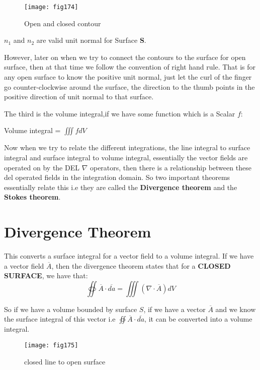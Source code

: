 \begin{figure}
	\centering
	\texttt{[image: fig174]}
	\caption{Open and closed contour}
	\label{fig:open-and-closed-contour}
\end{figure}


\textbf{$n_1$} and \textbf{$n_2$} are valid unit normal for Surface \textbf{S}.\newline

However, later on when we try to connect the contours to the surface for open surface, then at that time we follow the convention of right hand rule. That is for any open surface to know the positive unit normal, just let the curl of the finger go counter-clockwise around the surface, the direction to the thumb points in the positive direction of unit normal to that surface.\newline


The third is the volume integral,if we have some function which is a Scalar $f$:\newline

 Volume integral = $\iiint fdV$\newline
 
Now when we try to relate the different integrations, the line integral to surface integral and surface integral to volume integral, essentially the vector fields are operated on by the DEL $\nabla$ operators, then there is a relationship between these del operated fields in the integration domain. So two important theorems essentially relate this i.e they are called the \textbf{Divergence theorem} and the \textbf{Stokes theorem}.

\section{Divergence Theorem}

This converts a surface integral for a vector field to a volume integral. If we have a vector field $\overline{A}$, then the divergence theorem states that for a \textbf{CLOSED SURFACE}, we have that:
\begin{equation}
\oiint \overline{A} \cdot \overline{da} = \iiint (\nabla \cdot \overline{A})dV
\end{equation}
 
 So if we have a volume bounded by surface $S$, if we have a vector $\overline{A}$ and we know the surface integral of this vector i.e $\oiint \overline{A}\cdot\overline{da}$, it can be converted into a volume integral.
\begin{figure}
	\centering
	\texttt{[image: fig175]}
	\caption{closed line to open surface }
	\label{fig:page-8}
\end{figure}


